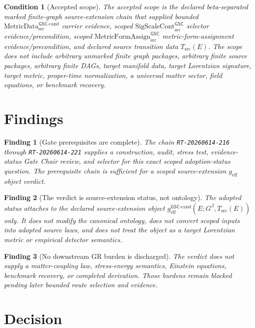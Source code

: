 \documentclass[11pt]{article}
\newcommand{\Gbeta}{G^\beta}
\newcommand{\MetricDataCand}{\mathrm{MetricData}^{\mathsf{GSC}\mbox{-}\mathrm{cand}}_{\mathrm{src}}}
\newcommand{\SigScaleCont}{\mathrm{SigScaleCont}^{\mathsf{GSC}}_{\mathrm{src}}}
\newcommand{\MetricFormAssign}{\mathrm{MetricFormAssign}^{\mathsf{GSC}}_{\mathrm{src}}}
\newcommand{\geff}{g_{\mathrm{eff}}}
\newcommand{\geffCand}{g_{\mathrm{eff}}^{\mathsf{GSC}\mbox{-}\mathrm{cand}}}
\newtheorem{finding}{Finding}
\newtheorem{condition}{Condition}
\begin{document}
\begin{condition}[Accepted scope]
The accepted scope is the declared beta-separated marked finite-graph
source-extension chain that supplied bounded \(\MetricDataCand\) carrier
evidence, scoped \(\SigScaleCont\) selector evidence/precondition, scoped
\(\MetricFormAssign\) metric-form-assignment evidence/precondition, and
declared source transition data \(T_{\mathrm{src}}(E)\). The scope does not
include arbitrary unmarked finite graph packages, arbitrary finite source
packages, arbitrary finite DAGs, target manifold data, target Lorentzian
signature, target metric, proper-time normalization, a universal matter
sector, field equations, or benchmark recovery.
\end{condition}

\section{Findings}

\begin{finding}[Gate prerequisites are complete]
The chain \texttt{RT-20260614-216} through \texttt{RT-20260614-221} supplies a
construction, audit, stress test, evidence-status Gate Chair review, and
selector for this exact scoped adoption-status question. The prerequisite
chain is sufficient for a scoped source-extension \(\geff\) object verdict.
\end{finding}

\begin{finding}[The verdict is source-extension status, not ontology]
The adopted status attaches to the declared source-extension object
\(\geffCand(E;\Gbeta,T_{\mathrm{src}}(E))\) only. It does not modify the
canonical ontology, does not convert scoped inputs into adopted source laws,
and does not treat the object as a target Lorentzian metric or empirical
detector semantics.
\end{finding}

\begin{finding}[No downstream GR burden is discharged]
The verdict does not supply a matter-coupling law, stress-energy semantics,
Einstein equations, benchmark recovery, or completed derivation. Those burdens
remain blocked pending later bounded route selection and evidence.
\end{finding}

\section{Decision}
\end{document}
